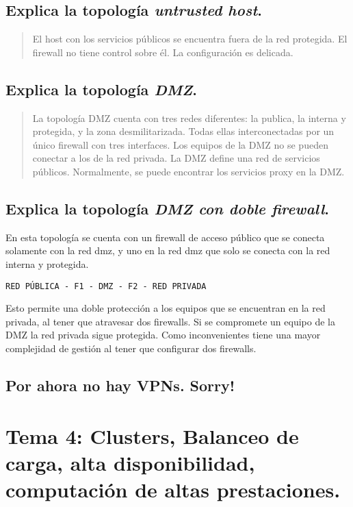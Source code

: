 \documentclass[11pt]{article}
\begin{document}
\subsection{Explica la topología \emph{untrusted host}.}
\label{sec:org05012e7}
\begin{quote}
El host con los servicios públicos se encuentra fuera de la red protegida. El firewall no tiene control sobre él. La configuración es delicada.
\end{quote}
\subsection{Explica la topología \emph{DMZ}.}
\label{sec:org0c4c066}
\begin{quote}
La topología DMZ cuenta con tres redes diferentes: la publica, la interna y protegida, y la zona desmilitarizada. Todas ellas interconectadas por un único firewall con tres interfaces.
Los equipos de la DMZ no se pueden conectar a los de la red privada. La DMZ define una red de servicios públicos. Normalmente, se puede encontrar los servicios proxy en la DMZ.
\end{quote}

\subsection{Explica la topología \emph{DMZ con doble firewall}.}
\label{sec:org443aa35}
En esta topología se cuenta con un firewall de acceso público que se conecta solamente con la red dmz, y uno en la red dmz que solo se conecta con la red interna y protegida.

\begin{verbatim}
RED PÚBLICA - F1 - DMZ - F2 - RED PRIVADA
\end{verbatim}

Esto permite una doble protección a los equipos que se encuentran en la red privada, al tener que atravesar dos firewalls. Si se compromete un equipo de la DMZ la red privada sigue protegida. Como inconvenientes tiene una mayor complejidad de gestión al tener que configurar dos firewalls.

\subsection{Por ahora no hay VPNs. Sorry!}
\label{sec:orgc388033}
\section{Tema 4: Clusters, Balanceo de carga, alta disponibilidad, computación de altas prestaciones.}
\label{sec:org14c0bb7}
\end{document}
